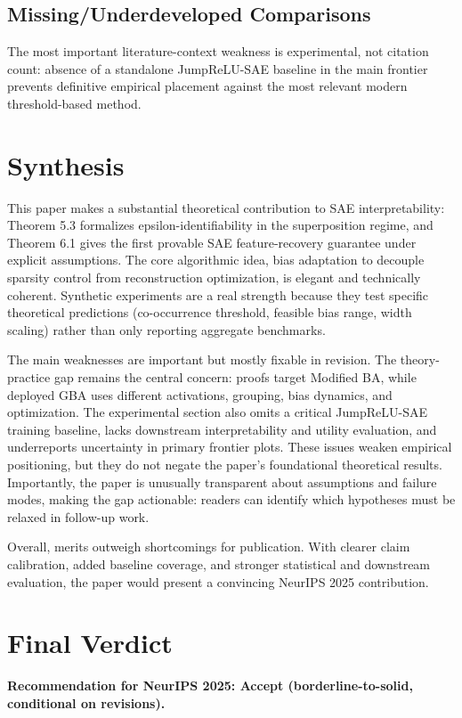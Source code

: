 \documentclass[11pt,a4paper]{article}
\begin{document}
\subsection*{Missing/Underdeveloped Comparisons}
The most important literature-context weakness is experimental, not citation count: absence of a standalone JumpReLU-SAE baseline in the main frontier prevents definitive empirical placement against the most relevant modern threshold-based method.

\section{Synthesis}
This paper makes a substantial theoretical contribution to SAE interpretability: Theorem 5.3 formalizes epsilon-identifiability in the superposition regime, and Theorem 6.1 gives the first provable SAE feature-recovery guarantee under explicit assumptions. The core algorithmic idea, bias adaptation to decouple sparsity control from reconstruction optimization, is elegant and technically coherent. Synthetic experiments are a real strength because they test specific theoretical predictions (co-occurrence threshold, feasible bias range, width scaling) rather than only reporting aggregate benchmarks.

The main weaknesses are important but mostly fixable in revision. The theory-practice gap remains the central concern: proofs target Modified BA, while deployed GBA uses different activations, grouping, bias dynamics, and optimization. The experimental section also omits a critical JumpReLU-SAE training baseline, lacks downstream interpretability and utility evaluation, and underreports uncertainty in primary frontier plots. These issues weaken empirical positioning, but they do not negate the paper's foundational theoretical results. Importantly, the paper is unusually transparent about assumptions and failure modes, making the gap actionable: readers can identify which hypotheses must be relaxed in follow-up work.

Overall, merits outweigh shortcomings for publication. With clearer claim calibration, added baseline coverage, and stronger statistical and downstream evaluation, the paper would present a convincing NeurIPS 2025 contribution.

\section{Final Verdict}
\textbf{Recommendation for NeurIPS 2025: Accept (borderline-to-solid, conditional on revisions).}
\end{document}
